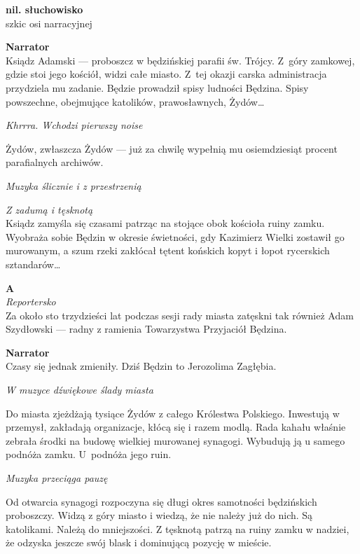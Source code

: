 \documentclass[11pt,a4paper,oneside]{article}
\begin{document}
\noindent
\textbf{nil. słuchowisko}\\
szkic osi narracyjnej

\textbf{Narrator}\\
Ksiądz Adamski --- proboszcz w będzińskiej parafii św. Trójcy.
Z~góry zamkowej, gdzie stoi jego kościół, widzi całe miasto.  Z~tej
okazji carska administracja przydziela mu zadanie. Będzie prowadził
spisy ludności Będzina.  Spisy powszechne, obejmujące katolików,
prawosławnych, Żydów\dots{} 

{\color{light-gray} \emph{Khrrra. Wchodzi pierwszy noise}}

Żydów, zwłaszcza Żydów --- już za chwilę wypełnią mu osiemdziesiąt procent
parafialnych archiwów. 

{\color{light-gray} \emph{Muzyka ślicznie i z przestrzenią}}

{\color{light-gray} \emph{Z zadumą i tęsknotą}} \\
Ksiądz zamyśla się czasami patrząc na stojące obok kościoła ruiny
zamku.  Wyobraża sobie Będzin w okresie świetności, gdy Kazimierz
Wielki zostawił go murowanym, a szum rzeki zakłócał tętent końskich
kopyt i łopot rycerskich sztandarów\dots{}

\textbf{A}\\
{\color{light-gray} \emph{Reportersko}}\\
Za około sto trzydzieści lat podczas sesji rady miasta zatęskni tak również Adam
Szydłowski --- radny z ramienia Towarzystwa Przyjaciół Będzina.

\textbf{Narrator}\\
Czasy się jednak zmieniły. Dziś Będzin to Jerozolima Zagłębia. 

{\color{light-gray} \emph{W muzyce dźwiękowe ślady miasta}}

Do miasta zjeżdżają tysiące Żydów z całego Królestwa Polskiego.
Inwestują w przemysł, zakładają organizacje, kłócą się i razem modlą.
Rada kahału właśnie zebrała środki na budowę wielkiej murowanej
synagogi. Wybudują ją u samego podnóża zamku. U~podnóża jego ruin.

{\color{light-gray} \emph{Muzyka przeciąga pauzę}}

Od otwarcia synagogi rozpoczyna się długi okres samotności będzińskich
proboszczy. Widzą z góry miasto i wiedzą, że nie należy już do nich.
Są katolikami. Należą do mniejszości. Z tęsknotą patrzą na ruiny zamku w nadziei,
że odzyska jeszcze swój blask i dominującą pozycję w mieście. 
\end{document}
